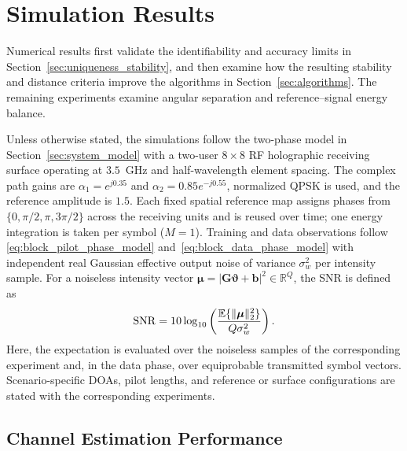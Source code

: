 \documentclass[journal]{IEEEtran}
\begin{document}
\section{Simulation Results}

Numerical results first validate the identifiability and accuracy limits in
Section~\ref{sec:uniqueness_stability}, and then examine how the resulting
stability and distance criteria improve the algorithms in
Section~\ref{sec:algorithms}. The remaining experiments examine angular
separation and reference--signal energy balance.

Unless otherwise stated, the simulations follow the two-phase model in
Section~\ref{sec:system_model} with a two-user $8\times8$ RF holographic receiving surface
operating at $3.5$~GHz and half-wavelength element spacing. The complex path
gains are $\alpha_1=e^{j0.35}$ and
$\alpha_2=0.85e^{-j0.55}$, normalized QPSK is used, and the reference amplitude
is $1.5$. Each fixed spatial reference map assigns phases from
$\{0,\pi/2,\pi,3\pi/2\}$ across the receiving units and is reused over time;
one energy integration is taken per symbol ($M=1$). Training and data observations follow
\eqref{eq:block_pilot_phase_model} and~\eqref{eq:block_data_phase_model} with
independent real Gaussian effective output noise of variance $\sigma_w^2$ per
intensity sample. For a noiseless intensity vector
$\boldsymbol{\mu}=|\mathbf{G}\boldsymbol{\vartheta}+\mathbf{b}|^2\in
\mathbb{R}^{Q}$, the SNR is defined as
\begin{equation}
{\rm SNR}
=
10\log_{10}
\left(
\frac{
\mathbb{E}\{\|\boldsymbol{\mu}\|_2^2\}
}{
Q\sigma_w^2
}
\right).
\label{eq:simulation_snr_definition}
\end{equation}
Here, the expectation is evaluated over the noiseless samples of the
corresponding experiment and, in the data phase, over equiprobable transmitted
symbol vectors.
Scenario-specific DOAs, pilot lengths, and reference or surface configurations are
stated with the corresponding experiments.

\subsection{Channel Estimation Performance}
\end{document}

